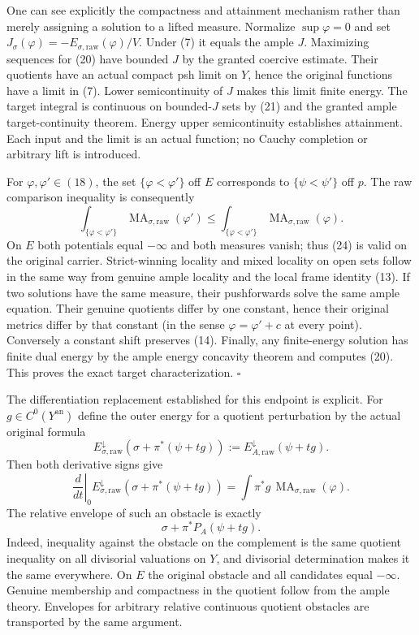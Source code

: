 \documentclass[
  10pt,
]{article}
\begin{document}
One can see explicitly the compactness and attainment mechanism rather
than merely assigning a solution to a lifted measure. Normalize
\(\sup\varphi=0\) and set
\(J_\sigma(\varphi)=-E_{\sigma,\mathrm{raw}}(\varphi)/V\). Under (7) it
equals the ample \(J\). Maximizing sequences for (20) have bounded \(J\)
by the granted coercive estimate. Their quotients have an actual compact
psh limit on \(Y\), hence the original functions have a limit in (7).
Lower semicontinuity of \(J\) makes this limit finite energy. The target
integral is continuous on bounded-\(J\) sets by (21) and the granted
ample target-continuity theorem. Energy upper semicontinuity establishes
attainment. Each input and the limit is an actual function; no Cauchy
completion or arbitrary lift is introduced.

For \(\varphi,\varphi'\in(18)\), the set \(\{\varphi<\varphi'\}\) off
\(E\) corresponds to \(\{\psi<\psi'\}\) off \(p\). The raw comparison
inequality is consequently \[
 \int_{\{\varphi<\varphi'\}}
       \operatorname{MA}_{\sigma,\mathrm{raw}}(\varphi')
 \le
 \int_{\{\varphi<\varphi'\}}
       \operatorname{MA}_{\sigma,\mathrm{raw}}(\varphi).
 \tag{24}
\] On \(E\) both potentials equal \(-\infty\) and both measures vanish;
thus (24) is valid on the original carrier. Strict-winning locality and
mixed locality on open sets follow in the same way from genuine ample
locality and the local frame identity (13). If two solutions have the
same measure, their pushforwards solve the same ample equation. Their
genuine quotients differ by one constant, hence their original metrics
differ by that constant (in the sense \(\varphi=\varphi'+c\) at every
point). Conversely a constant shift preserves (14). Finally, any
finite-energy solution has finite dual energy by the ample energy
concavity theorem and computes (20). This proves the exact target
characterization. \(\square\)

The differentiation replacement established for this endpoint is
explicit. For \(g\in C^0(Y^{\mathrm{an}})\) define the outer energy for
a quotient perturbation by the actual original formula \[
 E^{\downarrow}_{\sigma,\mathrm{raw}}
      (\sigma+\pi^*(\psi+tg))
 :=E^{\downarrow}_{A,\mathrm{raw}}(\psi+tg).
 \tag{25}
\] Then both derivative signs give \[
 \left.\frac d{dt}\right|_{0}
 E^{\downarrow}_{\sigma,\mathrm{raw}}
     (\sigma+\pi^*(\psi+tg))
   =\int\pi^*g\,\operatorname{MA}_{\sigma,\mathrm{raw}}(\varphi).
 \tag{26}
\] The relative envelope of such an obstacle is exactly
\[ \sigma+\pi^*P_A(\psi+tg). \tag{27} \] Indeed, inequality against the
obstacle on the complement is the same quotient inequality on all
divisorial valuations on \(Y\), and divisorial determination makes it
the same everywhere. On \(E\) the original obstacle and all candidates
equal \(-\infty\). Genuine membership and compactness in the quotient
follow from the ample theory. Envelopes for arbitrary relative
continuous quotient obstacles are transported by the same argument.
\end{document}
